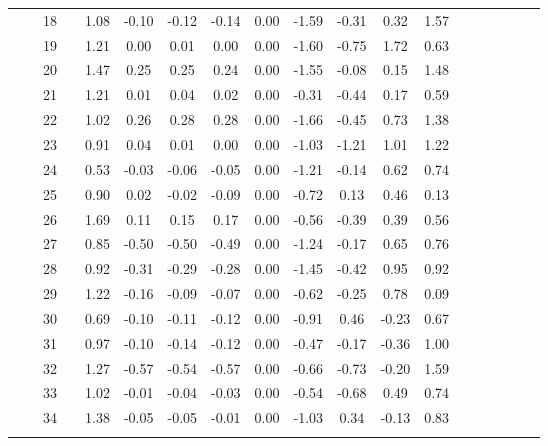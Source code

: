 \documentclass[a4paper,11pt,oneside,openany]{jsbook}
\newcommand{\bhline}[1]{\noalign{\hrule height #1}}
\begin{document}
\begin{table}[h!]
\begin{center}
\begin{tabular}{ccccccccccccccccccc}
 &  & 18 &  & 1.08 & -0.10 & -0.12 & -0.14 & 0.00 & -1.59 & -0.31 & 0.32  & 1.57 \\
 &  & 19 &  & 1.21 & 0.00  & 0.01  & 0.00  & 0.00 & -1.60 & -0.75 & 1.72  & 0.63 \\
 &  & 20 &  & 1.47 & 0.25  & 0.25  & 0.24  & 0.00 & -1.55 & -0.08 & 0.15  & 1.48 \\
 &  & 21 &  & 1.21 & 0.01  & 0.04  & 0.02  & 0.00 & -0.31 & -0.44 & 0.17  & 0.59 \\
 &  & 22 &  & 1.02 & 0.26  & 0.28  & 0.28  & 0.00 & -1.66 & -0.45 & 0.73  & 1.38 \\
 &  & 23 &  & 0.91 & 0.04  & 0.01  & 0.00  & 0.00 & -1.03 & -1.21 & 1.01  & 1.22 \\
 &  & 24 &  & 0.53 & -0.03 & -0.06 & -0.05 & 0.00 & -1.21 & -0.14 & 0.62  & 0.74 \\
 &  & 25 &  & 0.90 & 0.02  & -0.02 & -0.09 & 0.00 & -0.72 & 0.13  & 0.46  & 0.13 \\
 &  & 26 &  & 1.69 & 0.11  & 0.15  & 0.17  & 0.00 & -0.56 & -0.39 & 0.39  & 0.56 \\
 &  & 27 &  & 0.85 & -0.50 & -0.50 & -0.49 & 0.00 & -1.24 & -0.17 & 0.65  & 0.76 \\
 &  & 28 &  & 0.92 & -0.31 & -0.29 & -0.28 & 0.00 & -1.45 & -0.42 & 0.95  & 0.92 \\
 &  & 29 &  & 1.22 & -0.16 & -0.09 & -0.07 & 0.00 & -0.62 & -0.25 & 0.78  & 0.09 \\
 &  & 30 &  & 0.69 & -0.10 & -0.11 & -0.12 & 0.00 & -0.91 & 0.46  & -0.23 & 0.67 \\
 &  & 31 &  & 0.97 & -0.10 & -0.14 & -0.12 & 0.00 & -0.47 & -0.17 & -0.36 & 1.00 \\
 &  & 32 &  & 1.27 & -0.57 & -0.54 & -0.57 & 0.00 & -0.66 & -0.73 & -0.20 & 1.59 \\
 &  & 33 &  & 1.02 & -0.01 & -0.04 & -0.03 & 0.00 & -0.54 & -0.68 & 0.49  & 0.74 \\
  &  & 34 &  & 1.38 & -0.05 & -0.05 & -0.01 & 0.00 & -1.03 & 0.34 & -0.13 & 0.83\\
\bhline{1pt}
\end{tabular}
\label{t3param}
\end{center}
\end{table}
\end{document}
